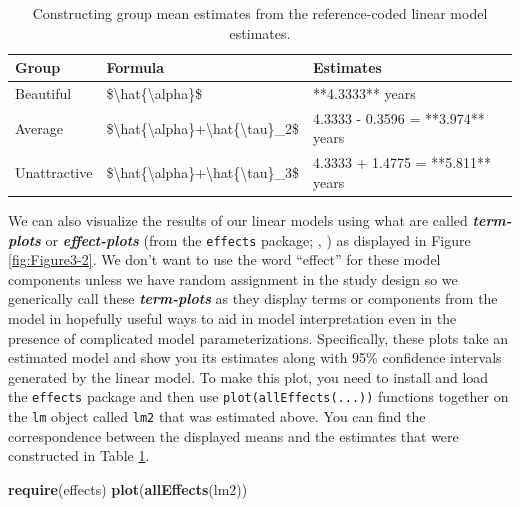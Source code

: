 \documentclass[]{book}
\newenvironment{Shaded}{\begin{snugshade}}{\end{snugshade}}
\newcommand{\KeywordTok}[1]{\textcolor[rgb]{0.13,0.29,0.53}{\textbf{#1}}}
\newcommand{\NormalTok}[1]{#1}
\theoremstyle{definition}
\theoremstyle{definition}
\theoremstyle{remark}
\begin{document}
\begin{table}

\caption{\label{tab:Table3-1}Constructing group mean estimates from the reference-coded
linear model estimates.}
\centering
\begin{tabular}[t]{l|l|l}
\hline
Group & Formula & Estimates\\
\hline
Beautiful & \$\textbackslash{}hat\{\textbackslash{}alpha\}\$ & **4.3333** years\\
\hline
Average & \$\textbackslash{}hat\{\textbackslash{}alpha\}+\textbackslash{}hat\{\textbackslash{}tau\}\_2\$ & 4.3333 - 0.3596 = **3.974** years\\
\hline
Unattractive & \$\textbackslash{}hat\{\textbackslash{}alpha\}+\textbackslash{}hat\{\textbackslash{}tau\}\_3\$ & 4.3333 + 1.4775 = **5.811** years\\
\hline
\end{tabular}
\end{table}

We can also visualize the results of our linear models using what are
called \textbf{\emph{term-plots}} or \textbf{\emph{effect-plots}} (from
the \texttt{effects} package; \citet{Fox2003}, \citep{R-effects}) as
displayed in Figure \ref{fig:Figure3-2}. We don't want to use the word
``effect'' for these model components unless we have random assignment
in the study design so we generically call these
\textbf{\emph{term-plots}} as they display terms or components from the
model in hopefully useful ways to aid in model interpretation even in
the presence of complicated model parameterizations. Specifically, these
plots take an estimated model and show you its estimates along with 95\%
confidence intervals generated by the linear model. To make this plot,
you need to install and load the \texttt{effects} package and then use
\texttt{plot(allEffects(...))} functions together on the \texttt{lm}
object called \texttt{lm2} that was estimated above. You can find the
correspondence between the displayed means and the estimates that were
constructed in Table \ref{tab:Table3-1}.




\begin{Shaded}
\begin{Highlighting}[]
\KeywordTok{require}\NormalTok{(effects)}
\KeywordTok{plot}\NormalTok{(}\KeywordTok{allEffects}\NormalTok{(lm2))}
\end{Highlighting}
\end{Shaded}
\end{document}
